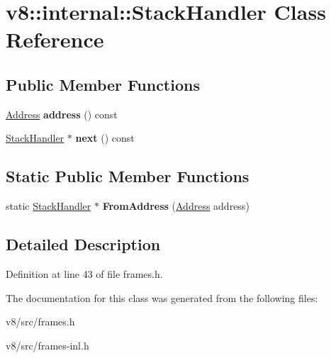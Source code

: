 \hypertarget{classv8_1_1internal_1_1StackHandler}{}\section{v8\+:\+:internal\+:\+:Stack\+Handler Class Reference}
\label{classv8_1_1internal_1_1StackHandler}
\subsection*{Public Member Functions}
\begin{DoxyCompactItemize}
\item 
\mbox{\label{classv8_1_1internal_1_1StackHandler_aa4b400bb5c41054133a0701ebac6bf92}} 
\mbox{\hyperlink{classuintptr__t}{Address}} {\bfseries address} () const
\item 
\mbox{\label{classv8_1_1internal_1_1StackHandler_ae90ebbcf509d7347b1eaf6f34e0a6fa6}} 
\mbox{\hyperlink{classv8_1_1internal_1_1StackHandler}{Stack\+Handler}} $\ast$ {\bfseries next} () const
\end{DoxyCompactItemize}
\subsection*{Static Public Member Functions}
\begin{DoxyCompactItemize}
\item 
\mbox{\label{classv8_1_1internal_1_1StackHandler_a878c902974fcfe3c4a0712a6eb5241d8}} 
static \mbox{\hyperlink{classv8_1_1internal_1_1StackHandler}{Stack\+Handler}} $\ast$ {\bfseries From\+Address} (\mbox{\hyperlink{classuintptr__t}{Address}} address)
\end{DoxyCompactItemize}


\subsection{Detailed Description}


Definition at line 43 of file frames.\+h.



The documentation for this class was generated from the following files\+:\begin{DoxyCompactItemize}
\item 
v8/src/frames.\+h\item 
v8/src/frames-\/inl.\+h\end{DoxyCompactItemize}

